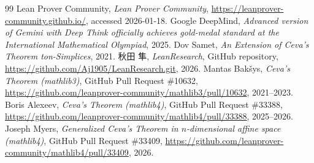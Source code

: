 \documentclass[a4paper,12pt]{bxjsbook}
\newlength{\customindent}
\newenvironment{body}{
  \par
  \begingroup
  \setlength{\leftskip}{\customindent}
  \setlength{\rightskip}{0pt}
  \setlength{\parindent}{1em}
  \setlength{\displayindent}{\customindent}
  \setlength{\displaywidth}{\dimexpr\linewidth-\customindent\relax}
}{
  \par
  \endgroup
}
\theoremstyle{theorem}
\begin{document}
\begin{body}
    \begin{thebibliography}{99}
         Lean Prover Community, \emph{Lean Prover Community}, \url{https://leanprover-community.github.io/}, accessed 2026-01-18.
         Google DeepMind, \emph{Advanced version of Gemini with Deep Think officially achieves gold-medal standard at the International Mathematical Olympiad}, 2025.
         Dov Samet, \emph{An Extension of Ceva's Theorem ton-Simplices}, 2021.
         秋田 隼, \emph{LeanResearch}, GitHub repository, \url{https://github.com/Aj1905/LeanResearch.git}, 2026.
         Mantas Bakšys, \emph{Ceva's Theorem (mathlib3)}, GitHub Pull Request \#10632, \url{https://github.com/leanprover-community/mathlib3/pull/10632}, 2021--2023.
         Boris Alexeev, \emph{Ceva's Theorem (mathlib4)}, GitHub Pull Request \#33388, \url{https://github.com/leanprover-community/mathlib4/pull/33388}, 2025--2026.
         Joseph Myers, \emph{Generalized Ceva's Theorem in $n$-dimensional affine space (mathlib4)}, GitHub Pull Request \#33409, \url{https://github.com/leanprover-community/mathlib4/pull/33409}, 2026.
    \end{thebibliography}
\end{document}
